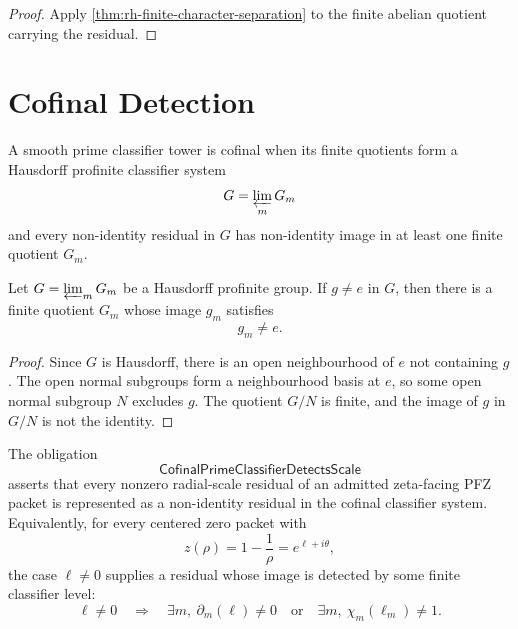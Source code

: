 \begin{proof}
Apply \autoref{thm:rh-finite-character-separation} to the finite
abelian quotient carrying the residual.
\end{proof}

\section{Cofinal Detection}
\label{sec:rh-smooth-prime-cofinal-detection}

\begin{definition}
\label{def:rh-cofinal-prime-classifier-tower}
A smooth prime classifier tower is cofinal when its finite quotients form
a Hausdorff profinite classifier system
$$
G=\varprojlim_m G_m
$$
and every non-identity residual in $G$ has non-identity image in at least
one finite quotient $G_m$.
\end{definition}

\begin{theorem}
\label{thm:rh-profinite-residual-separation}
Let $G=\varprojlim_m G_m$ be a Hausdorff profinite group.  If $g\ne e$ in
$G$, then there is a finite quotient $G_m$ whose image $g_m$ satisfies
$$
g_m\ne e.
$$
\end{theorem}

\begin{proof}
Since $G$ is Hausdorff, there is an open neighbourhood of $e$ not
containing $g$.  The open normal subgroups form a neighbourhood basis at
$e$, so some open normal subgroup $N$ excludes $g$.  The quotient $G/N$
is finite, and the image of $g$ in $G/N$ is not the identity.
\end{proof}

\begin{definition}[CofinalPrimeClassifierDetectsScale]
\label{def:rh-cofinal-prime-classifier-detects-scale}
The obligation
$$
\mathsf{CofinalPrimeClassifierDetectsScale}
$$
asserts that every nonzero radial-scale residual of an admitted
zeta-facing PFZ packet is represented as a non-identity residual in the
cofinal classifier system.  Equivalently, for every centered zero packet
with
$$
z(\rho)=1-\frac1\rho=e^{\ell+i\theta},
$$
the case $\ell\ne0$ supplies a residual whose image is detected by some
finite classifier level:
$$
\ell\ne0
\quad\Longrightarrow\quad
\exists m,\ \partial_m(\ell)\ne0
\quad\text{or}\quad
\exists m,\ \chi_m(\ell_m)\ne1.
$$
\end{definition}


